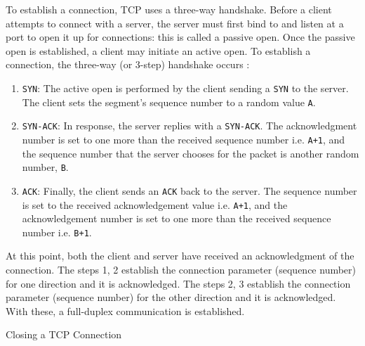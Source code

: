 To establish a connection, TCP uses a three-way handshake. Before a client attempts to
connect with a server, the server must first bind to and listen at a port to open it up
for connections: this is called a passive open. Once the passive open is established, a
client may initiate an active open. To establish a connection, the three-way (or 3-step)
handshake occurs :
\begin{enumerate}
\item \texttt{SYN}: The active open is performed by the client sending a \texttt{SYN} to
  the server. The client sets the segment's sequence number to a random value \texttt{A}.
\item \texttt{SYN-ACK}: In response, the server replies with a \texttt{SYN-ACK}. The
  acknowledgment number is set to one more than the received sequence number
  i.e. \texttt{A+1}, and the sequence number that the server chooses for the packet is
  another random number, \texttt{B}.
\item \texttt{ACK}: Finally, the client sends an \texttt{ACK} back to the server. The
  sequence number is set to the received acknowledgement value i.e. \texttt{A+1}, and the
  acknowledgement number is set to one more than the received sequence number
  i.e. \texttt{B+1}.
\end{enumerate}
At this point, both the client and server have received an acknowledgment of the
connection. The steps 1, 2 establish the connection parameter (sequence number) for one
direction and it is acknowledged. The steps 2, 3 establish the connection parameter
(sequence number) for the other direction and it is acknowledged. With these, a
full-duplex communication is established.

\begin{frame}{Closing a TCP Connection}
  \begin{center}
  \end{center}
  \label{fig:3way-close}
\end{frame}

